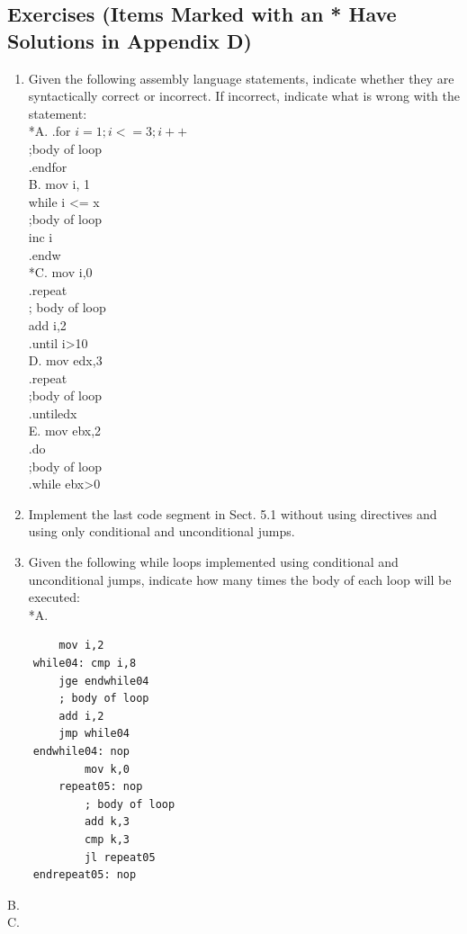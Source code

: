 \documentclass[10pt]{book}
\begin{document}
\subsection{Exercises (Items Marked with an * Have Solutions in Appendix D)}
\begin{enumerate}
  \item Given the following assembly language statements, indicate whether they are syntactically correct or incorrect. If incorrect, indicate what is wrong with the statement:\\
*A. .for $i=1 ; i<=3 ; i++$\\
;body of loop\\
.endfor\\
B. mov i, 1\\
while i <= x\\
;body of loop\\
inc i\\
.endw\\
*C. mov i,0\\
.repeat\\
; body of loop\\
add i,2\\
.until i>10\\
D. mov edx,3\\
.repeat\\
;body of loop\\
.untiledx\\
E. mov ebx,2\\
.do\\
;body of loop\\
.while ebx>0
  \item Implement the last code segment in Sect. 5.1 without using directives and using only conditional and unconditional jumps.
  \item Given the following while loops implemented using conditional and unconditional jumps, indicate how many times the body of each loop will be executed:\\
*A.
\end{enumerate}

\begin{verbatim}
        mov i,2
    while04: cmp i,8
        jge endwhile04
        ; body of loop
        add i,2
        jmp while04
    endwhile04: nop
            mov k,0
        repeat05: nop
            ; body of loop
            add k,3
            cmp k,3
            jl repeat05
    endrepeat05: nop
\end{verbatim}

B.\\
C.
\end{document}
